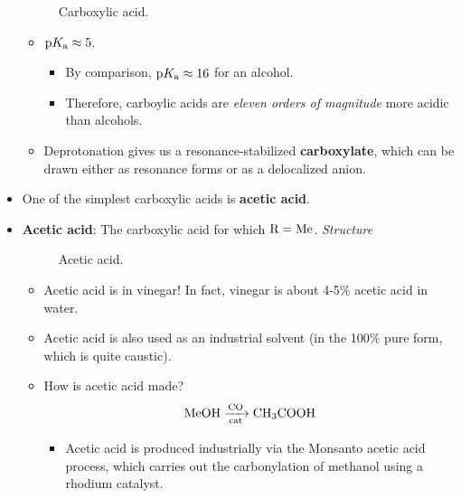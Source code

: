 \documentclass[../notes.tex]{subfiles}
\begin{document}
\begin{itemize}
\begin{figure}[h!]
{                
            }\chemright{]}
            \arrow{0[\small$\equiv$][][-2mm]}
        \schemestop
        \caption{Carboxylic acid.}
        \label{fig:carbAcid}
    \end{figure}
    \begin{itemize}
        \item $\textup{p}K_\textup{a}\approx 5$.
        \begin{itemize}
            \item By comparison, $\textup{p}K_\textup{a}\approx 16$ for an alcohol.
            \item Therefore, carboylic acids are \emph{eleven orders of magnitude} more acidic than alcohols.
        \end{itemize}
        \item Deprotonation gives us a resonance-stabilized \textbf{carboxylate}, which can be drawn either as resonance forms or as a delocalized anion.
    \end{itemize}
    \item One of the simplest carboxylic acids is \textbf{acetic acid}.
    \item \textbf{Acetic acid}: The carboxylic acid for which $\ce{R}=\ce{Me}$. \emph{Structure}
    \begin{figure}[h!]
        \centering
        \footnotesize
        \caption{Acetic acid.}
        \label{fig:aceticAcid}
    \end{figure}
    \begin{itemize}
        \item Acetic acid is in vinegar! In fact, vinegar is about 4-5\% acetic acid in water.
        \item Acetic acid is also used as an industrial solvent (in the 100\% pure form, which is quite caustic).
        \item How is acetic acid made?
        \begin{equation*}
            \ce{MeOH ->[CO][cat] CH3COOH}
        \end{equation*}
        \begin{itemize}
            \item Acetic acid is produced industrially via the Monsanto acetic acid process, which carries out the carbonylation of methanol using a rhodium catalyst.

\end{itemize}
\end{itemize}
\end{itemize}
\end{document}
